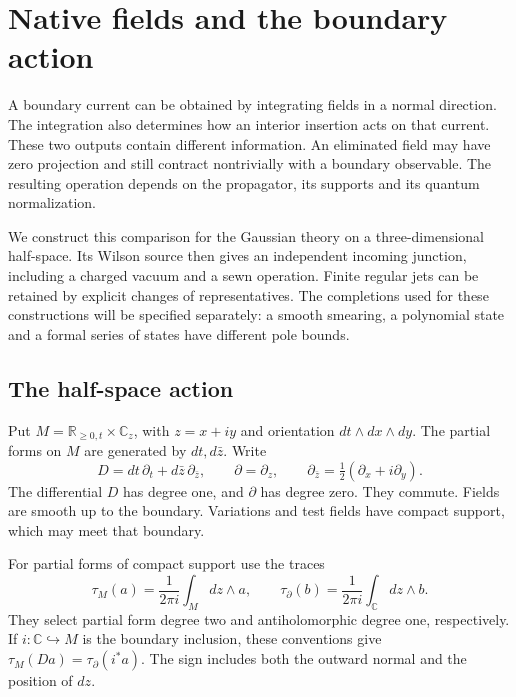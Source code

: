 \chapter{Native fields and the boundary action}
\label{ch:vol2-native-bulk-boundary}

A boundary current can be obtained by integrating fields in a normal
direction. The integration also determines how an interior insertion acts
on that current. These two outputs contain different information.
An eliminated field may have zero projection and still contract nontrivially
with a boundary observable. The resulting operation depends on the
propagator, its supports and its quantum normalization.

We construct this comparison for the Gaussian theory on a three-dimensional
half-space. Its Wilson source then gives an independent incoming junction,
including a charged vacuum and a sewn operation. Finite regular jets can be
retained by explicit changes of representatives. The completions used for
these constructions will be specified separately: a smooth smearing, a
polynomial state and a formal series of states have different pole bounds.

\section{The half-space action}

Put \(M=\mathbb R_{\geq0,t}\times\mathbb C_z\), with
\(z=x+iy\) and orientation \(dt\wedge dx\wedge dy\).
The partial forms on \(M\) are generated by \(dt,d\bar z\). Write
\[
 D=dt\,\partial_t+d\bar z\,\partial_{\bar z},\qquad
 \partial=\partial_z,\qquad
 \partial_{\bar z}=\tfrac12(\partial_x+i\partial_y).
\]
The differential \(D\) has degree one, and \(\partial\) has degree zero.
They commute. Fields are smooth up to the boundary. Variations and test
fields have compact support, which may meet that boundary.

For partial forms of compact support use the traces
\begin{equation}\label{eq:vol2-native-traces}
 \tau_M(a)=\frac1{2\pi i}\int_M dz\wedge a,
 \qquad
 \tau_\partial(b)=\frac1{2\pi i}\int_{\mathbb C}dz\wedge b.
\end{equation}
They select partial form degree two and antiholomorphic degree one,
respectively. If \(i:\mathbb C\hookrightarrow M\) is the boundary inclusion,
these conventions give \(\tau_M(Da)=\tau_\partial(i^*a)\).
The sign includes both the outward normal and the position of \(dz\).

